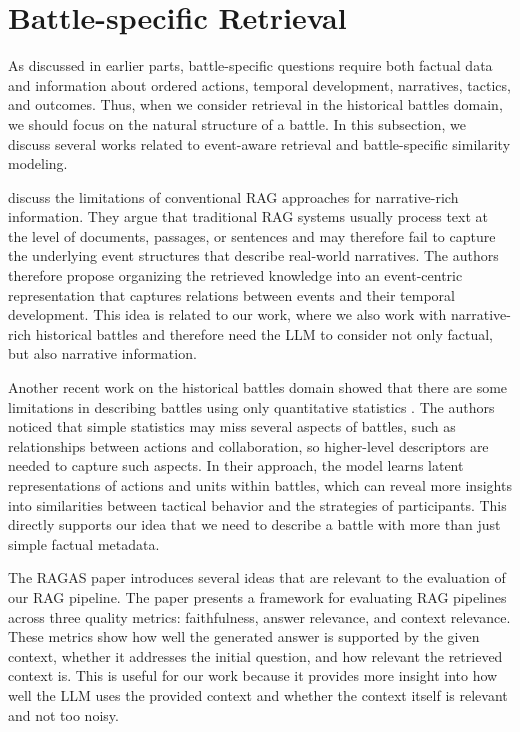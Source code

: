 \section{Battle-specific Retrieval}
As discussed in earlier parts, battle-specific questions require both factual data and information about ordered actions, temporal development, narratives, tactics, and outcomes. Thus, when we consider retrieval in the historical battles domain, we should focus on the natural structure of a battle. In this subsection, we discuss several works related to event-aware retrieval and battle-specific similarity modeling.

\citet{yang2025eventrag} discuss the limitations of conventional RAG approaches for narrative-rich information. They argue that traditional RAG systems usually process text at the level of documents, passages, or sentences and may therefore fail to capture the underlying event structures that describe real-world narratives. The authors therefore propose organizing the retrieved knowledge into an event-centric representation that captures relations between events and their temporal development. This idea is related to our work, where we also work with narrative-rich historical battles and therefore need the LLM to consider not only factual, but also narrative information.

Another recent work on the historical battles domain showed that there are some limitations in describing battles using only quantitative statistics \citep{coulson2023actionclusters}. The authors noticed that simple statistics may miss several aspects of battles, such as relationships between actions and collaboration, so higher-level descriptors are needed to capture such aspects. In their approach, the model learns latent representations of actions and units within battles, which can reveal more insights into similarities between tactical behavior and the strategies of participants. This directly supports our idea that we need to describe a battle with more than just simple factual metadata.

The RAGAS paper \citep{es2024ragas} introduces several ideas that are relevant to the evaluation of our RAG pipeline. The paper presents a framework for evaluating RAG pipelines across three quality metrics: faithfulness, answer relevance, and context relevance. These metrics show how well the generated answer is supported by the given context, whether it addresses the initial question, and how relevant the retrieved context is. This is useful for our work because it provides more insight into how well the LLM uses the provided context and whether the context itself is relevant and not too noisy.
